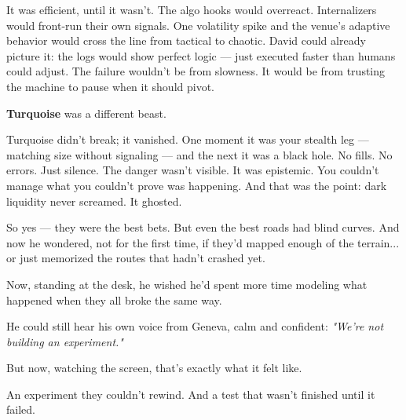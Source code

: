 \begin{tcolorbox}[
    enhanced,
    sharp corners,
    boxrule=0pt,
    colback=gray!3,
    borderline west={2pt}{0pt}{gray!60}, %
    left=10pt,
    right=10pt,
    top=6pt,
    bottom=6pt,
    width=\linewidth,
    fontupper=\small\itshape
  ]
It was efficient, until it wasn’t. The algo hooks would overreact. Internalizers would front-run their own signals. One volatility spike and the venue’s adaptive behavior would cross the line from tactical to chaotic.
David could already picture it: the logs would show perfect logic — just executed faster than humans could adjust.
The failure wouldn’t be from slowness. It would be from trusting the machine to pause when it should pivot.
\end{tcolorbox}


\textbf{Turquoise} was a different beast.
\begin{tcolorbox}[
    enhanced,
    sharp corners,
    boxrule=0pt,
    colback=gray!3,
    borderline west={2pt}{0pt}{gray!60}, %
    left=10pt,
    right=10pt,
    top=6pt,
    bottom=6pt,
    width=\linewidth,
    fontupper=\small\itshape
  ]
Turquoise didn’t break; it vanished. One moment it was your stealth leg — matching size without signaling — and the next it was a black hole.
No fills. No errors. Just silence.
The danger wasn’t visible. It was epistemic.
You couldn’t manage what you couldn’t prove was happening. And that was the point: dark liquidity never screamed. It ghosted.
\end{tcolorbox}

So yes — they were the best bets.
But even the best roads had blind curves.
And now he wondered, not for the first time, if they’d mapped enough of the terrain...
or just memorized the routes that hadn’t crashed yet.

Now, standing at the desk, he wished he’d spent more time modeling what happened when they all broke 
the same way.

He could still hear his own voice from Geneva, calm and confident:
\textit{"We’re not building an experiment."}

But now, watching the screen, that’s exactly what it felt like.

An experiment they couldn’t rewind.
And a test that wasn’t finished until it failed.

\medskip

